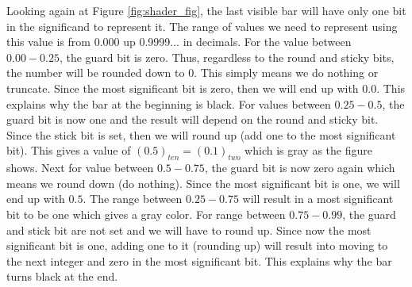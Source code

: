 Looking again at Figure \ref{fig:shader_fig}, the last visible bar will have only one bit in the significand to represent it. The range of values we need to represent using this value is from 0.000 up 0.9999... in decimals. For the value between $0.00-0.25$, the guard bit is zero. Thus, regardless to the round and sticky bits, the number will be rounded down to 0. This simply means we do nothing or truncate. Since the most significant bit is zero, then we will end up with $0.0$. This explains why the bar at the beginning is black. For values between $0.25-0.5$, the guard bit is now one and the result will depend on the round and sticky bit. Since the stick bit is set, then we will round up (add one to the most significant bit). This gives a value of $(0.5)_{ten}=(0.1)_{two}$ which is gray as the figure shows. Next for value between $0.5-0.75$, the guard bit is now zero again which means we round down (do nothing). Since the most significant bit is one, we will end up with $0.5$. The range between $0.25-0.75$ will result in a most significant bit to be one which gives a gray color. For range between $0.75-0.99$, the guard and stick bit are not set and we will have to round up. Since now the most significant bit is one, adding one to it (rounding up) will result into moving to the next integer and zero in the most significant bit. This explains why the bar turns black at the end. 

 





